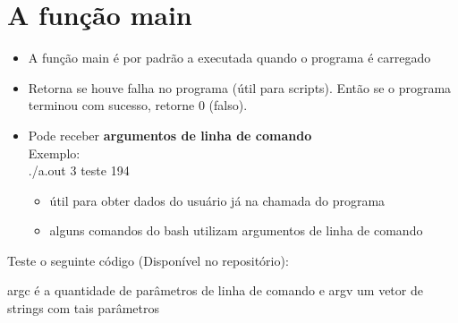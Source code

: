 \documentclass[portuguese,10pt,xcolor=table]{bredelebeamer}
\begin{document}
	\section{A função main}
	\begin{frame}
		\begin{center}
		\end{center}
	\end{frame} 

	\begin{frame}
		\begin{itemize}
			\item A função main é por padrão a executada quando o programa é carregado
			\item Retorna se houve falha no programa (útil para scripts). Então se o programa terminou com sucesso, retorne 0 (falso).
			\item Pode receber \textbf{argumentos de linha de comando}\\
				Exemplo:\\
				\colorbox{gray!30}{./a.out 3 teste 194}\\
				\begin{itemize}
					\item útil para obter dados do usuário já na chamada do programa
					\item alguns comandos do bash utilizam argumentos de linha de comando
				\end{itemize}
		\end{itemize}
	\end{frame}


	\begin{frame}
		Teste o seguinte código (Disponível no repositório):
				
				argc é a quantidade de parâmetros de linha de comando e argv um vetor de strings com tais parâmetros
	\end{frame}


	
\end{document}
